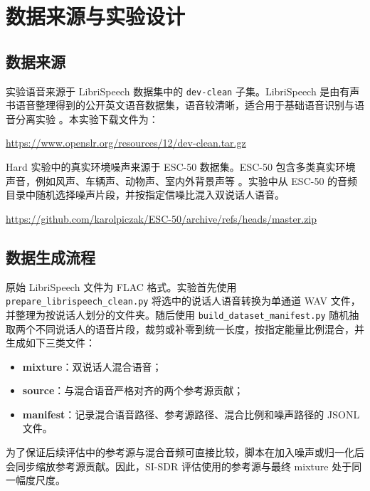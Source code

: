\section{数据来源与实验设计}

\subsection{数据来源}

实验语音来源于 LibriSpeech 数据集中的 \texttt{dev-clean} 子集。LibriSpeech 是由有声书语音整理得到的公开英文语音数据集，语音较清晰，适合用于基础语音识别与语音分离实验 \cite{panayotov2015librispeech}。本实验下载文件为：

\begin{center}
\url{https://www.openslr.org/resources/12/dev-clean.tar.gz}
\end{center}

Hard 实验中的真实环境噪声来源于 ESC-50 数据集。ESC-50 包含多类真实环境声音，例如风声、车辆声、动物声、室内外背景声等 \cite{piczak2015esc}。实验中从 ESC-50 的音频目录中随机选择噪声片段，并按指定信噪比混入双说话人语音。

\begin{center}
\url{https://github.com/karolpiczak/ESC-50/archive/refs/heads/master.zip}
\end{center}

\subsection{数据生成流程}

原始 LibriSpeech 文件为 FLAC 格式。实验首先使用 \texttt{prepare\_librispeech\_clean.py} 将选中的说话人语音转换为单通道 WAV 文件，并整理为按说话人划分的文件夹。随后使用 \texttt{build\_dataset\_manifest.py} 随机抽取两个不同说话人的语音片段，裁剪或补零到统一长度，按指定能量比例混合，并生成如下三类文件：

\begin{itemize}
    \item \textbf{mixture}：双说话人混合语音；
    \item \textbf{source}：与混合语音严格对齐的两个参考源贡献；
    \item \textbf{manifest}：记录混合语音路径、参考源路径、混合比例和噪声路径的 JSONL 文件。
\end{itemize}

为了保证后续评估中的参考源与混合音频可直接比较，脚本在加入噪声或归一化后会同步缩放参考源贡献。因此，SI-SDR 评估使用的参考源与最终 mixture 处于同一幅度尺度。

